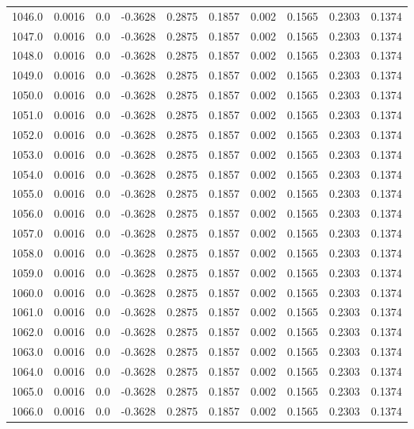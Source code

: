 \begin{longtable}{lrrrrrrrrr}
1046.0 & 0.0016 & 0.0 & -0.3628 & 0.2875 & 0.1857 & 0.002 & 0.1565 & 0.2303 & 0.1374 \\
1047.0 & 0.0016 & 0.0 & -0.3628 & 0.2875 & 0.1857 & 0.002 & 0.1565 & 0.2303 & 0.1374 \\
1048.0 & 0.0016 & 0.0 & -0.3628 & 0.2875 & 0.1857 & 0.002 & 0.1565 & 0.2303 & 0.1374 \\
1049.0 & 0.0016 & 0.0 & -0.3628 & 0.2875 & 0.1857 & 0.002 & 0.1565 & 0.2303 & 0.1374 \\
1050.0 & 0.0016 & 0.0 & -0.3628 & 0.2875 & 0.1857 & 0.002 & 0.1565 & 0.2303 & 0.1374 \\
1051.0 & 0.0016 & 0.0 & -0.3628 & 0.2875 & 0.1857 & 0.002 & 0.1565 & 0.2303 & 0.1374 \\
1052.0 & 0.0016 & 0.0 & -0.3628 & 0.2875 & 0.1857 & 0.002 & 0.1565 & 0.2303 & 0.1374 \\
1053.0 & 0.0016 & 0.0 & -0.3628 & 0.2875 & 0.1857 & 0.002 & 0.1565 & 0.2303 & 0.1374 \\
1054.0 & 0.0016 & 0.0 & -0.3628 & 0.2875 & 0.1857 & 0.002 & 0.1565 & 0.2303 & 0.1374 \\
1055.0 & 0.0016 & 0.0 & -0.3628 & 0.2875 & 0.1857 & 0.002 & 0.1565 & 0.2303 & 0.1374 \\
1056.0 & 0.0016 & 0.0 & -0.3628 & 0.2875 & 0.1857 & 0.002 & 0.1565 & 0.2303 & 0.1374 \\
1057.0 & 0.0016 & 0.0 & -0.3628 & 0.2875 & 0.1857 & 0.002 & 0.1565 & 0.2303 & 0.1374 \\
1058.0 & 0.0016 & 0.0 & -0.3628 & 0.2875 & 0.1857 & 0.002 & 0.1565 & 0.2303 & 0.1374 \\
1059.0 & 0.0016 & 0.0 & -0.3628 & 0.2875 & 0.1857 & 0.002 & 0.1565 & 0.2303 & 0.1374 \\
1060.0 & 0.0016 & 0.0 & -0.3628 & 0.2875 & 0.1857 & 0.002 & 0.1565 & 0.2303 & 0.1374 \\
1061.0 & 0.0016 & 0.0 & -0.3628 & 0.2875 & 0.1857 & 0.002 & 0.1565 & 0.2303 & 0.1374 \\
1062.0 & 0.0016 & 0.0 & -0.3628 & 0.2875 & 0.1857 & 0.002 & 0.1565 & 0.2303 & 0.1374 \\
1063.0 & 0.0016 & 0.0 & -0.3628 & 0.2875 & 0.1857 & 0.002 & 0.1565 & 0.2303 & 0.1374 \\
1064.0 & 0.0016 & 0.0 & -0.3628 & 0.2875 & 0.1857 & 0.002 & 0.1565 & 0.2303 & 0.1374 \\
1065.0 & 0.0016 & 0.0 & -0.3628 & 0.2875 & 0.1857 & 0.002 & 0.1565 & 0.2303 & 0.1374 \\
1066.0 & 0.0016 & 0.0 & -0.3628 & 0.2875 & 0.1857 & 0.002 & 0.1565 & 0.2303 & 0.1374 \\

\end{longtable}
